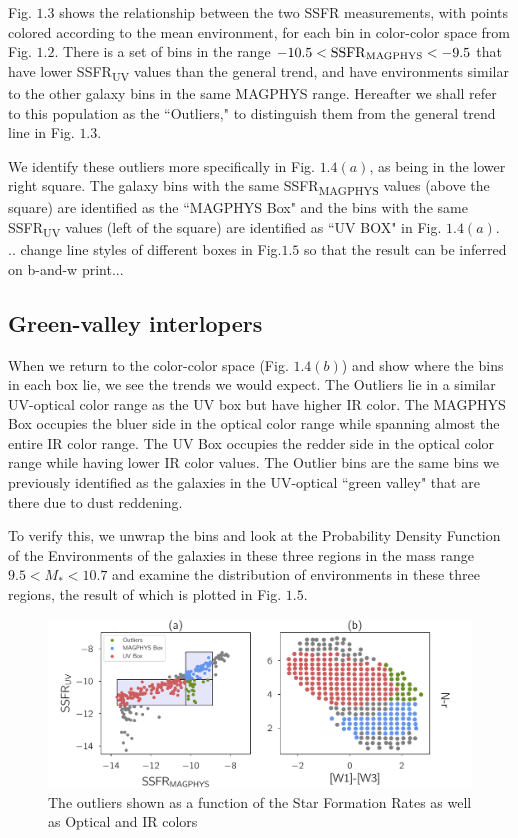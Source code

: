 Fig. $1.3$ shows the relationship between the two SSFR measurements,
with points colored according to the mean environment, for each bin 
in color-color space from Fig. $1.2$. There is a set of bins in 
the range $-10.5 < \mathrm{SSFR\textsubscript{MAGPHYS}}< -9.5$ that 
have lower SSFR\textsubscript{UV} values than the general trend, 
and have environments similar to the other galaxy bins in the same 
MAGPHYS range. Hereafter we shall refer to this population as the 
``Outliers," to distinguish them from the general trend line in 
Fig. $1.3$. 

We identify these outliers more specifically in Fig. $1.4(a)$, as 
being in the lower right square. The galaxy bins with the same 
SSFR\textsubscript{MAGPHYS} values (above the square) are identified 
as the ``MAGPHYS Box" and the bins with the same SSFR\textsubscript{UV} 
values (left of the square) are identified as ``UV BOX" in Fig. 
$1.4(a)$. \\

.. change line styles of different boxes in Fig.$1.5$ so that the result can be inferred on b-and-w print...
  
\subsection{Green-valley interlopers}

When we return to the color-color space (Fig. $1.4(b)$) and 
show where the bins in each box lie, we see the trends we would expect. 
The Outliers lie in a similar UV-optical color range as the UV box but 
have higher IR color. The MAGPHYS Box occupies the bluer side 
in the optical color range while spanning almost the entire IR 
color range. The UV Box occupies the redder side in the optical 
color range while having lower IR color values. The Outlier bins 
are the same bins we previously identified as the galaxies in the 
UV-optical ``green valley" that are there due to dust reddening. 

To verify this, we unwrap the bins and look at the Probability 
Density Function of the Environments of the galaxies in these three regions in the mass range  $ 9.5 < M_{*} < 10.7$ and examine the distribution of environments in these three regions, the result of which is plotted in Fig. $1.5$.

\begin{figure}
\includegraphics[width=\textwidth]{figures/3_outliers.pdf}
\caption[Short figure name.]{The outliers shown as a function of the Star Formation Rates as well as Optical and IR colors
\label{fig:myInlineFigure}}
\end{figure}
 
